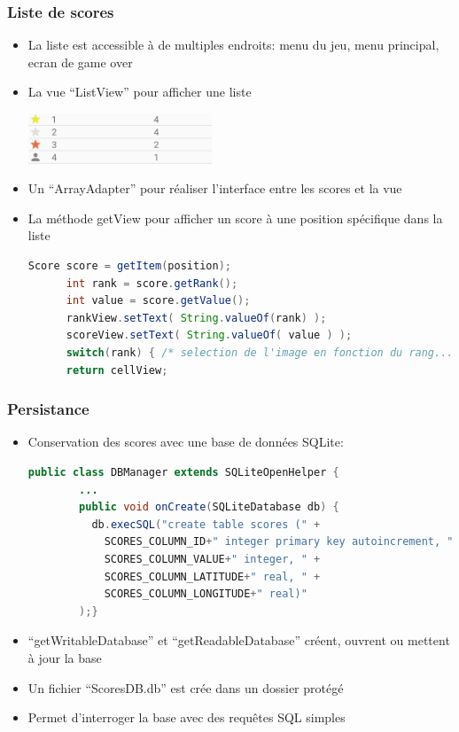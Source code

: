 \documentclass[handout]{beamer}
\begin{document}
\begin{frame}[fragile]
  \frametitle<1->{Liste de scores}
  \begin{itemize}
    \item <1->{La liste est accessible à de multiples endroits: menu du jeu, menu principal, ecran de game over}
    \item <2->{La vue \enquote{ListView} pour afficher une liste}
    \begin{center}
      \includegraphics[height=15mm]{scores_list.png}
    \end{center}
    \item <3->{Un \enquote{ArrayAdapter} pour réaliser l'interface entre les scores et la vue}%
    \item <4->{La méthode getView pour afficher un score à une position spécifique dans la liste}
    \begin{lstlisting}[language=java]
      Score score = getItem(position);
      int rank = score.getRank();
      int value = score.getValue();
      rankView.setText( String.valueOf(rank) );
      scoreView.setText( String.valueOf( value ) );
      switch(rank) { /* selection de l'image en fonction du rang... */ }
      return cellView;
    \end{lstlisting}
  \end{itemize}
\end{frame}

\begin{frame}[fragile]
  \frametitle<1->{Persistance}
    \begin{itemize}
    \item <1->{Conservation des scores avec une base de données SQLite:}
    \begin{lstlisting}[language=java]
      public class DBManager extends SQLiteOpenHelper {
        ...
        public void onCreate(SQLiteDatabase db) { 
          db.execSQL("create table scores (" +
            SCORES_COLUMN_ID+" integer primary key autoincrement, " +
            SCORES_COLUMN_VALUE+" integer, " +
            SCORES_COLUMN_LATITUDE+" real, " +
            SCORES_COLUMN_LONGITUDE+" real)"
        );}
    \end{lstlisting}
    \item <2->{\enquote{getWritableDatabase} et \enquote{getReadableDatabase} créent, ouvrent ou mettent à jour la base}
    \item <3->{Un fichier \enquote{ScoresDB.db} est crée dans un dossier protégé}
    \item <4->{Permet d'interroger la base avec des requêtes SQL simples} %
    \end{itemize}
\end{frame}
\end{document}

